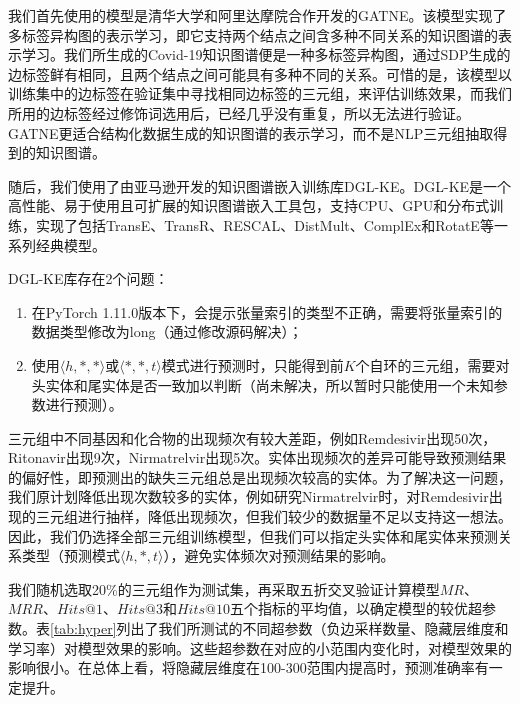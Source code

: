 \documentclass[twocolumn]{article}
\begin{document}
我们首先使用的模型是清华大学和阿里达摩院合作开发的GATNE\cite{GATNE}。该模型实现了多标签异构图的表示学习，即它支持两个结点之间含多种不同关系的知识图谱的表示学习。我们所生成的Covid-19知识图谱便是一种多标签异构图，通过SDP生成的边标签鲜有相同，且两个结点之间可能具有多种不同的关系。可惜的是，该模型以训练集中的边标签在验证集中寻找相同边标签的三元组，来评估训练效果，而我们所用的边标签经过修饰词选用后，已经几乎没有重复，所以无法进行验证。GATNE更适合结构化数据生成的知识图谱的表示学习，而不是NLP三元组抽取得到的知识图谱。\par
随后，我们使用了由亚马逊开发的知识图谱嵌入训练库DGL-KE\cite{DGL-KE}。DGL-KE是一个高性能、易于使用且可扩展的知识图谱嵌入工具包，支持CPU、GPU和分布式训练，实现了包括TransE、TransR、RESCAL、DistMult、ComplEx和RotatE等一系列经典模型。\par
DGL-KE库存在2个问题：\par
\begin{enumerate}
	\item 在PyTorch 1.11.0版本下，会提示张量索引的类型不正确，需要将张量索引的数据类型修改为long（通过修改源码解决）；
	\item 使用$\langle h, *, *\rangle$或$\langle *, *, t\rangle$模式进行预测时，只能得到前$K$个自环的三元组，需要对头实体和尾实体是否一致加以判断（尚未解决，所以暂时只能使用一个未知参数进行预测）。
\end{enumerate}\par
三元组中不同基因和化合物的出现频次有较大差距，例如Remdesivir出现50次，Ritonavir出现9次，Nirmatrelvir出现5次。实体出现频次的差异可能导致预测结果的偏好性，即预测出的缺失三元组总是出现频次较高的实体。为了解决这一问题，我们原计划降低出现次数较多的实体，例如研究Nirmatrelvir时，对Remdesivir出现的三元组进行抽样，降低出现频次，但我们较少的数据量不足以支持这一想法。因此，我们仍选择全部三元组训练模型，但我们可以指定头实体和尾实体来预测关系类型（预测模式$\langle h, *, t\rangle$），避免实体频次对预测结果的影响。\par
我们随机选取20\%的三元组作为测试集，再采取五折交叉验证计算模型$MR$、$MRR$、$Hits@1$、$Hits@3$和$Hits@10$五个指标的平均值，以确定模型的较优超参数。表\ref{tab:hyper}列出了我们所测试的不同超参数（负边采样数量、隐藏层维度和学习率）对模型效果的影响。这些超参数在对应的小范围内变化时，对模型效果的影响很小。在总体上看，将隐藏层维度在100-300范围内提高时，预测准确率有一定提升。\par
\end{document}

